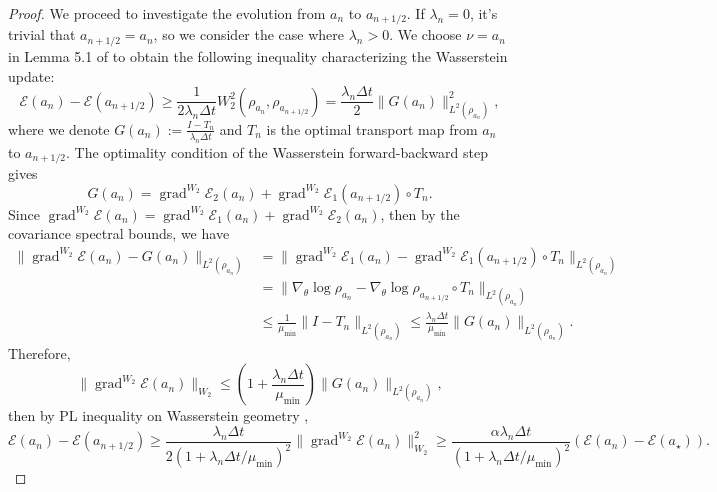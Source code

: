 \documentclass[11pt]{article}
\theoremstyle{plain}
\theoremstyle{definition}
\theoremstyle{remark}
\newcommand{\Id}{I}
\newcommand{\grad}{\operatorname{grad}}
\begin{document}
\begin{proof}
    We proceed to investigate the evolution from $a_n$ to $a_{n+1/2}$. If $\lambda_n = 0$, it's trivial that $a_{n+1/2} = a_n$, so we consider the case where $\lambda_n > 0$. We choose $\nu = a_n$ in Lemma 5.1 of \cite{diao2023forward} to obtain the following inequality characterizing the Wasserstein update:
    \begin{equation*}
        \mathcal{E} (a_n) - \mathcal{E} (a_{n+1/2}) \geq \frac{1}{2\lambda_n \Delta t} W_2^2 (\rho_{a_n}, \rho_{a_{n+1/2}}) = \frac{\lambda_n \Delta t}{2} \|G (a_n) \|_{L^2 (\rho_{a_n})}^2,
    \end{equation*}
    where we denote $G (a_n) := \frac{\Id - T_n}{\lambda_n \Delta t}$ and $T_n$ is the optimal transport map from $a_n$ to $a_{n+1/2}$. The optimality condition of the Wasserstein forward-backward step gives
    \begin{equation*}
        G (a_n) = \grad^{W_2} \mathcal{E}_2 (a_n) + \grad^{W_2} \mathcal{E}_1 (a_{n+1/2}) \circ T_n.
    \end{equation*}
    Since $\grad^{W_2} \mathcal{E} (a_n) = \grad^{W_2} \mathcal{E}_1 (a_n) + \grad^{W_2} \mathcal{E}_2 (a_n)$, then by the covariance spectral bounds, we have
    \begin{align*}
        \| \grad^{W_2} \mathcal{E} (a_n) - G(a_n) \|_{L^2 (\rho_{a_n})} &= \| \grad^{W_2} \mathcal{E}_1 (a_n) - \grad^{W_2} \mathcal{E}_1 (a_{n+1/2}) \circ T_n \|_{L^2 (\rho_{a_n})} \\
        &= \| \nabla_\theta \log \rho_{a_n} - \nabla_\theta \log \rho_{a_{n+1/2}} \circ T_n \|_{L^2 (\rho_{a_n})} \\
        &\leq \frac{1}{\mu_{\min}} \| \Id - T_n \|_{L^2 (\rho_{a_n})} \leq \frac{\lambda_n \Delta t}{\mu_{\min}} \| G(a_n) \|_{L^2 (\rho_{a_n})}.
    \end{align*}
    Therefore,
    \begin{equation*}
        \| \grad^{W_2} \mathcal{E} (a_n) \|_{W_2} \leq \left( 1 + \frac{\lambda_n \Delta t}{\mu_{\min}} \right) \| G(a_n) \|_{L^2 (\rho_{a_n})},
    \end{equation*}
    then by PL inequality on Wasserstein geometry \cite{lambert2022variational},
    \begin{equation*}
        \mathcal{E} (a_n) - \mathcal{E} (a_{n+1/2}) \geq \frac{\lambda_n \Delta t}{2 (1 + \lambda_n \Delta t / \mu_{\min})^2} \| \grad^{W_2} \mathcal{E} (a_n) \|_{W_2}^2 \geq \frac{\alpha \lambda_n \Delta t}{(1 + \lambda_n \Delta t / \mu_{\min})^2} (\mathcal{E} (a_n) - \mathcal{E} (a_\star)).
    \end{equation*}

\end{proof}
\end{document}
